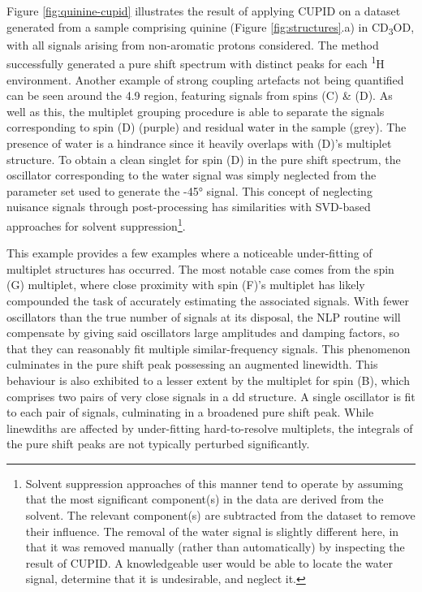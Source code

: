 Figure \ref{fig:quinine-cupid} illustrates the result of applying \ac{CUPID} on
a dataset generated from a sample comprising quinine (Figure
\ref{fig:structures}.a) in CD\textsubscript{3}OD,
with all signals arising from non-aromatic protons considered. The method
successfully generated a pure shift spectrum with distinct peaks for each
\textsuperscript{1}H environment.
Another example of strong coupling artefacts not being quantified can be seen
around the \qty{4.9}{\partspermillion} region, featuring signals from spins (C)
\& (D). As well as this, the multiplet grouping procedure is able to separate
the signals corresponding to spin (D) (purple) and residual water in the sample
(grey).
The presence of water is a hindrance since it heavily overlaps with (D)'s
multiplet structure.
To obtain a clean singlet for spin (D) in the pure shift spectrum, the
oscillator corresponding to the water signal was simply neglected from
the parameter set used to generate the \ang{-45} signal. This concept of
neglecting nuisance signals through post-processing has similarities with
\ac{SVD}-based approaches for solvent suppression\cite{Zhu1997}\footnote{
    Solvent suppression approaches of this manner tend to operate by assuming
    that the most significant component(s) in the data are derived from the
    solvent. The relevant component(s) are subtracted from the dataset to
    remove their influence. The removal of the water signal is slightly
    different here, in that it was removed manually (rather than automatically)
    by inspecting the result of \ac{CUPID}.
    A knowledgeable user would be able to locate the water signal, determine
    that it is undesirable, and neglect it.
}.

This example provides a few examples where a noticeable under-fitting of
multiplet structures has occurred.
The most notable case comes from the spin (G) multiplet, where close proximity
with spin (F)'s multiplet has likely compounded the task of accurately
estimating the associated signals. With fewer oscillators than the true number
of signals at its disposal, the \ac{NLP} routine will compensate
by giving said oscillators large amplitudes and damping factors, so that they
can reasonably fit multiple similar-frequency signals. This phenomenon
culminates in the pure shift peak possessing an augmented linewidth.
This behaviour is also exhibited to a lesser extent by the multiplet for spin
(B), which comprises two pairs of very close signals in a dd structure. A
single oscillator is fit to each pair of signals, culminating in a broadened
pure shift peak. While linewdiths are affected by under-fitting hard-to-resolve
multiplets, the integrals of the pure shift peaks are not typically perturbed
significantly.

